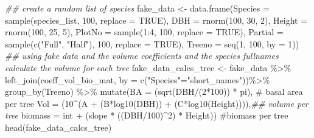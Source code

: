 \documentclass[
  letterpaper,
]{book}
\newenvironment{Shaded}{\begin{snugshade}}{\end{snugshade}}
\newcommand{\AttributeTok}[1]{\textcolor[rgb]{0.40,0.45,0.13}{#1}}
\newcommand{\CommentTok}[1]{\textcolor[rgb]{0.37,0.37,0.37}{#1}}
\newcommand{\ConstantTok}[1]{\textcolor[rgb]{0.56,0.35,0.01}{#1}}
\newcommand{\DecValTok}[1]{\textcolor[rgb]{0.68,0.00,0.00}{#1}}
\newcommand{\DocumentationTok}[1]{\textcolor[rgb]{0.37,0.37,0.37}{\textit{#1}}}
\newcommand{\FunctionTok}[1]{\textcolor[rgb]{0.28,0.35,0.67}{#1}}
\newcommand{\NormalTok}[1]{\textcolor[rgb]{0.00,0.23,0.31}{#1}}
\newcommand{\OtherTok}[1]{\textcolor[rgb]{0.00,0.23,0.31}{#1}}
\newcommand{\SpecialCharTok}[1]{\textcolor[rgb]{0.37,0.37,0.37}{#1}}
\newcommand{\StringTok}[1]{\textcolor[rgb]{0.13,0.47,0.30}{#1}}
\begin{document}
\begin{Shaded}
\begin{Highlighting}[]
\DocumentationTok{\#\# create a random list of species}
\NormalTok{fake\_data }\OtherTok{\textless{}{-}} \FunctionTok{data.frame}\NormalTok{(}\AttributeTok{Species =} \FunctionTok{sample}\NormalTok{(species\_list, }\DecValTok{100}\NormalTok{, }\AttributeTok{replace =} \ConstantTok{TRUE}\NormalTok{), }
                        \AttributeTok{DBH =} \FunctionTok{rnorm}\NormalTok{(}\DecValTok{100}\NormalTok{, }\DecValTok{30}\NormalTok{, }\DecValTok{2}\NormalTok{),}
                        \AttributeTok{Height =} \FunctionTok{rnorm}\NormalTok{(}\DecValTok{100}\NormalTok{, }\DecValTok{25}\NormalTok{, }\DecValTok{5}\NormalTok{),}
                        \AttributeTok{PlotNo =} \FunctionTok{sample}\NormalTok{(}\DecValTok{1}\SpecialCharTok{:}\DecValTok{4}\NormalTok{, }\DecValTok{100}\NormalTok{, }\AttributeTok{replace =} \ConstantTok{TRUE}\NormalTok{),}
                        \AttributeTok{Partial =} \FunctionTok{sample}\NormalTok{(}\FunctionTok{c}\NormalTok{(}\StringTok{"Full"}\NormalTok{, }\StringTok{"Half"}\NormalTok{), }\DecValTok{100}\NormalTok{, }\AttributeTok{replace =} \ConstantTok{TRUE}\NormalTok{),}
                        \AttributeTok{Treeno =} \FunctionTok{seq}\NormalTok{(}\DecValTok{1}\NormalTok{, }\DecValTok{100}\NormalTok{, }\AttributeTok{by =} \DecValTok{1}\NormalTok{))}
\DocumentationTok{\#\# using fake data and the volume coefficients and the species fullnames calculate the volume for each tree}
\NormalTok{fake\_data\_calcs\_tree }\OtherTok{\textless{}{-}}\NormalTok{ fake\_data }\SpecialCharTok{\%\textgreater{}\%} \FunctionTok{left\_join}\NormalTok{(coeff\_vol\_bio\_mat, }\AttributeTok{by =} \FunctionTok{c}\NormalTok{(}\StringTok{"Species"}\OtherTok{=}\StringTok{"short\_names"}\NormalTok{))}\SpecialCharTok{\%\textgreater{}\%} 
  \FunctionTok{group\_by}\NormalTok{(Treeno) }\SpecialCharTok{\%\textgreater{}\%}
  \FunctionTok{mutate}\NormalTok{(}\AttributeTok{BA =}\NormalTok{ (}\FunctionTok{sqrt}\NormalTok{(DBH}\SpecialCharTok{/}\NormalTok{(}\DecValTok{2}\SpecialCharTok{*}\DecValTok{100}\NormalTok{)) }\SpecialCharTok{*}\NormalTok{ pi), }\CommentTok{\# basal area per tree}
         \AttributeTok{Vol =}\NormalTok{  (}\DecValTok{10}\SpecialCharTok{\^{}}\NormalTok{(A }\SpecialCharTok{+}\NormalTok{ (B}\SpecialCharTok{*}\FunctionTok{log10}\NormalTok{(DBH)) }\SpecialCharTok{+}\NormalTok{ (C}\SpecialCharTok{*}\FunctionTok{log10}\NormalTok{(Height)))),}\DocumentationTok{\#\# volume per tree}
         \AttributeTok{biomass =}\NormalTok{ int }\SpecialCharTok{+}\NormalTok{ (slope }\SpecialCharTok{*}\NormalTok{ ((DBH}\SpecialCharTok{/}\DecValTok{100}\NormalTok{)}\SpecialCharTok{\^{}}\DecValTok{2}\NormalTok{) }\SpecialCharTok{*}\NormalTok{ Height)) }\CommentTok{\#biomass per tree}
\FunctionTok{head}\NormalTok{(fake\_data\_calcs\_tree)}
\end{Highlighting}
\end{Shaded}
\end{document}
